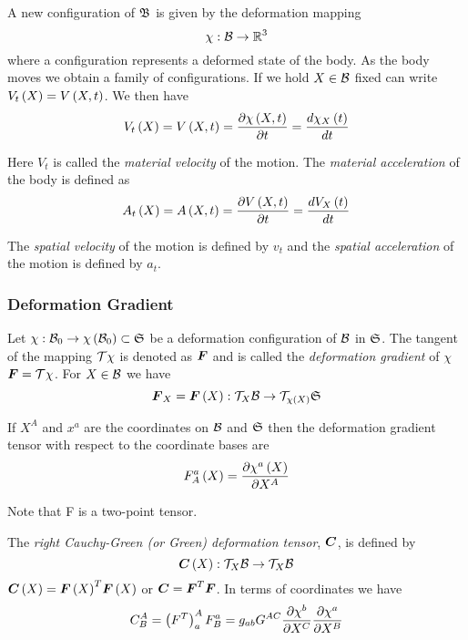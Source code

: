 A new configuration of $\manifold{B}$ is given by the deformation mapping
\begin{equation}
  \mapping{\chi}{\embedmanifold{B}}{\rntopology{3}}
\end{equation}
where a configuration represents a deformed state of the body. As the body
moves we obtain a family of configurations. If we hold $X\in\embedmanifold{B}$
fixed can write $\fnof{V_{t}}{X}=\fnof{V}{X,t}$. We then have
\begin{equation}
  \fnof{V_{t}}{X}=\fnof{V}{X,t}=\delby{\fnof{\chi}{X,t}}{t}=\dby{\fnof{\chi_{X}}{t}}{t}
\end{equation}

Here $V_{t}$ is called the \textit{material velocity} of the motion. The
\textit{material acceleration} of the body is defined as
\begin{equation}
  \fnof{A_{t}}{X}=\fnof{A}{X,t}=\delby{\fnof{V}{X,t}}{t}=\dby{\fnof{V_{X}}{t}}{t}
\end{equation}

The \textit{spatial velocity} of the motion is defined by $v_{t}$ and the
\textit{spatial acceleration} of the motion is defined by $a_{t}$.

\subsubsection{Deformation Gradient}

Let
$\mapping{\chi}{\embedmanifold{B}_{0}}{\fnof{\chi}{\embedmanifold{B}_{0}}\subset\manifold{S}}$
be a deformation configuration of $\embedmanifold{B}$ in $\manifold{S}$. The
tangent of the mapping \ie $\tangentbundle{\chi}$ is denoted as $\tensor{F}$
and is called the \textit{deformation gradient} of $\chi$ \ie
$\tensor{F}=\tangentbundle{\chi}$. For $X\in\embedmanifold{B}$ we have
\begin{equation}
  \tensor{F}_{X}=\mapping{\fnof{\tensor{F}}{X}}{\tangentspace{\embedmanifold{B}}{X}}{\tangentspace{\manifold{S}}{\fnof{\chi}{X}}}
\end{equation}
 
If $X^{A}$ and $x^{a}$ are the coordinates on $\embedmanifold{B}$ and
$\manifold{S}$ then the deformation gradient tensor with respect to the
coordinate bases are
\begin{equation}
  \fnof{F^{a}_{A}}{X}=\delby{\fnof{\chi^{a}}{X}}{X^{A}}
\end{equation}

Note that F is a two-point tensor. 

The \textit{right Cauchy-Green (or Green) deformation tensor}, $\tensor{C}$, is defined by
\begin{equation}
  \mapping{\fnof{\tensor{C}}{X}}{\tangentspace{\embedmanifold{B}}{X}}{\tangentspace{\embedmanifold{B}}{X}}
\end{equation}
\ie $\fnof{\tensor{C}}{X}=\transpose{\fnof{\tensor{F}}{X}}\fnof{\tensor{F}}{X}$
or $\tensor{C}=\transpose{\tensor{F}}\tensor{F}$. In terms of coordinates we
have
\begin{equation}
  C^{A}_{B}=\pbrac{\transpose{F}}^{A}_{a}F^{a}_{B}=g_{ab}G^{AC}\delby{\chi^{b}}{X^{C}}\delby{\chi^{a}}{X^{B}}
\end{equation}

